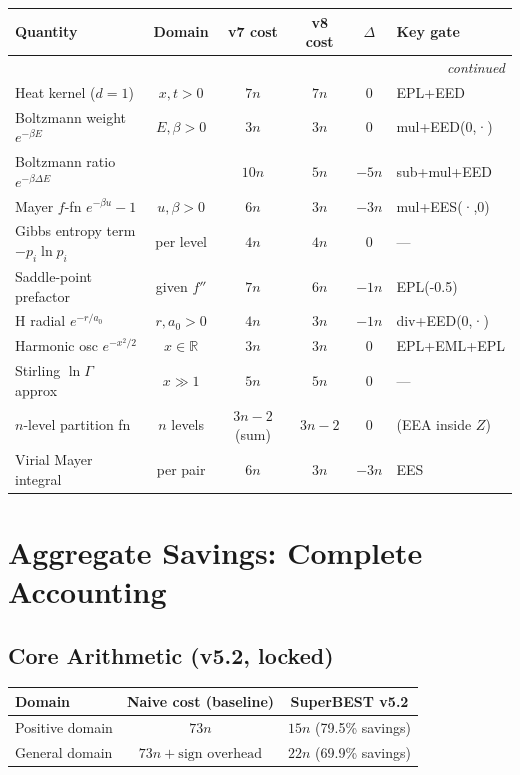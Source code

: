 \documentclass[11pt]{article}
\begin{document}
\begin{longtable}{lccccl}
\toprule
Quantity & Domain & v7 cost & v8 cost & $\Delta$ & Key gate \\
\midrule
\endhead
\midrule
\multicolumn{6}{r}{\textit{continued}} \\
\endfoot
\bottomrule
\endlastfoot
Heat kernel ($d=1$) & $x,t>0$ & $7n$ & $7n$ & $0$ & EPL+EED \\
Boltzmann weight $e^{-\beta E}$ & $E,\beta>0$ & $3n$ & $3n$ & $0$ & mul+EED(0,·) \\
Boltzmann ratio $e^{-\beta\Delta E}$ & & $10n$ & $5n$ & $-5n$ & sub+mul+EED \\
Mayer $f$-fn $e^{-\beta u}-1$ & $u,\beta>0$ & $6n$ & $3n$ & $-3n$ & mul+EES(·,0) \\
Gibbs entropy term $-p_i\ln p_i$ & per level & $4n$ & $4n$ & $0$ & --- \\
Saddle-point prefactor & given $f''$ & $7n$ & $6n$ & $-1n$ & EPL(-0.5) \\
H radial $e^{-r/a_0}$ & $r,a_0>0$ & $4n$ & $3n$ & $-1n$ & div+EED(0,·) \\
Harmonic osc $e^{-x^2/2}$ & $x\in\mathbb{R}$ & $3n$ & $3n$ & $0$ & EPL+EML+EPL \\
Stirling $\ln\Gamma$ approx & $x\gg1$ & $5n$ & $5n$ & $0$ & --- \\
$n$-level partition fn & $n$ levels & $3n-2$ (sum) & $3n-2$& $0$ & (EEA inside $Z$) \\
Virial Mayer integral & per pair & $6n$ & $3n$ & $-3n$ & EES \\
\end{longtable}

\section{Aggregate Savings: Complete Accounting}

\subsection{Core Arithmetic (v5.2, locked)}

\begin{center}
\begin{tabular}{lcc}
\toprule
Domain & Naive cost (baseline) & SuperBEST v5.2 \\
\midrule
Positive domain & $73n$ & $15n$ (79.5\% savings) \\
General domain & $73n+\text{sign overhead}$ & $22n$ (69.9\% savings) \\
\bottomrule
\end{tabular}
\end{center}
\end{document}

